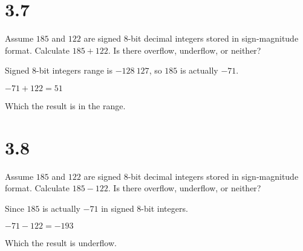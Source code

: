 \documentclass[paper=a4, fontsize=11pt]{scrartcl} %
\begin{document}
\section{3.7}

\begin{fancyquotes}
  Assume $185$ and $122$ are signed 8-bit decimal integers stored in sign-magnitude format. Calculate $185+122$. Is there overflow, underflow, or neither?
\end{fancyquotes}

Signed 8-bit integers range is $-128~127$, so $185$ is actually $-71$.

$-71 + 122 = 51$

Which the result is in the range.


\section{3.8}

\begin{fancyquotes}
  Assume $185$ and $122$ are signed 8-bit decimal integers stored in sign-magnitude format. Calculate $185-122$. Is there overflow, underflow, or neither?
\end{fancyquotes}

Since $185$ is actually $-71$ in signed 8-bit integers.

$-71 - 122 = -193$

Which the result is underflow.
\end{document}
